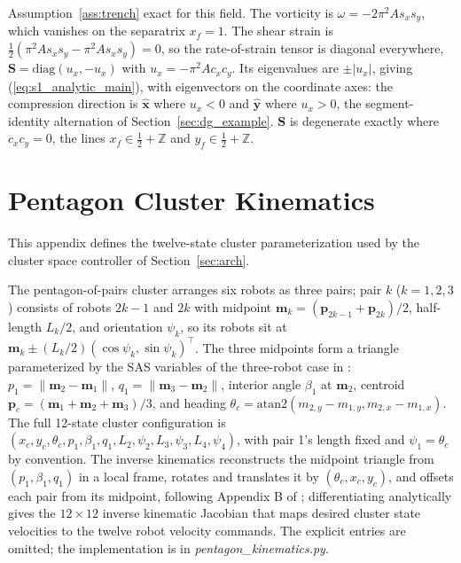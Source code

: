 \documentclass[lettersize,journal]{IEEEtran}
\begin{document}
Assumption~\ref{ass:trench} exact for this field. The vorticity is
$\omega = -2\pi^2 A s_x s_y$, which vanishes on the separatrix
$x_f = 1$. The shear strain is $\tfrac{1}{2}(\pi^2 A s_x s_y - \pi^2 A
s_x s_y) = 0$, so the rate-of-strain tensor is diagonal everywhere,
$\mathbf{S} = \mathrm{diag}(u_x, -u_x)$ with $u_x = -\pi^2 A c_x c_y$.
Its eigenvalues are $\pm|u_x|$, giving (\ref{eq:s1_analytic_main}),
with eigenvectors on the coordinate axes: the compression direction is
$\hat{\mathbf{x}}$ where $u_x < 0$ and $\hat{\mathbf{y}}$ where $u_x >
0$, the segment-identity alternation of Section~\ref{sec:dg_example}.
$\mathbf{S}$ is degenerate exactly where $c_x c_y = 0$, the lines
$x_f \in \tfrac{1}{2} + \mathbb{Z}$ and $y_f \in \tfrac{1}{2} +
\mathbb{Z}$.


\section{Pentagon Cluster Kinematics}
\label{app:kinematics}

This appendix defines the twelve-state cluster parameterization used
by the cluster space controller of Section~\ref{sec:arch}.

The pentagon-of-pairs cluster arranges six robots as three pairs; pair
$k$ ($k = 1, 2, 3$) consists of robots $2k-1$ and $2k$ with midpoint
$\mathbf{m}_k = (\mathbf{p}_{2k-1} + \mathbf{p}_{2k})/2$, half-length
$L_k/2$, and orientation $\psi_k$, so its robots sit at $\mathbf{m}_k
\pm (L_k/2)(\cos\psi_k, \sin\psi_k)^\top$. The three midpoints form a
triangle parameterized by the SAS variables of the three-robot case in
\cite{14}: $p_1 = \|\mathbf{m}_2 - \mathbf{m}_1\|$, $q_1 =
\|\mathbf{m}_3 - \mathbf{m}_2\|$, interior angle $\beta_1$ at
$\mathbf{m}_2$, centroid $\mathbf{p}_c = (\mathbf{m}_1 + \mathbf{m}_2 +
\mathbf{m}_3)/3$, and heading $\theta_c = \text{atan2}(m_{2,y} -
m_{1,y}, m_{2,x} - m_{1,x})$. The full 12-state cluster configuration
is $(x_c, y_c, \theta_c, p_1, \beta_1, q_1, L_2, \psi_2, L_3, \psi_3,
L_4, \psi_4)$, with pair 1's length fixed and $\psi_1 = \theta_c$ by
convention. The inverse kinematics reconstructs the midpoint triangle
from $(p_1, \beta_1, q_1)$ in a local frame, rotates and translates it
by $(\theta_c, x_c, y_c)$, and offsets each pair from its midpoint,
following Appendix B of \cite{14}; differentiating analytically gives
the $12 \times 12$ inverse kinematic Jacobian that maps desired cluster
state velocities to the twelve robot velocity commands. The explicit
entries are omitted; the implementation is in
\textit{pentagon\_kinematics.py}.
\end{document}

